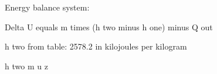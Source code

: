 Energy balance system:  

Delta U equals m times (h two minus h one) minus Q out  

h two from table: 2578.2 in kilojoules per kilogram  

h two m u z